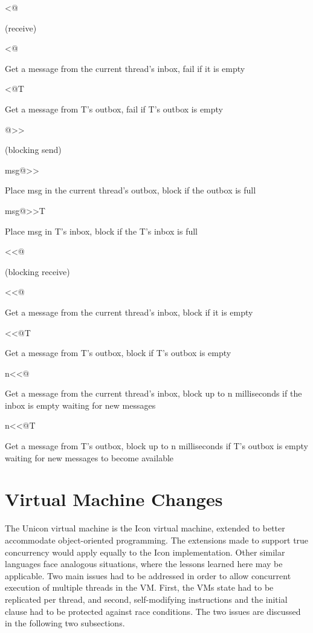 <@

(receive)

<@

Get a message from the current thread's inbox, fail if it is empty

<@T

Get a message from T's outbox, fail if T's outbox is empty

@>>

(blocking send)

msg@>>

Place msg in the current thread's outbox, block if the outbox is full

msg@>>T

Place msg in T's inbox, block if the T's inbox is full

<<@

(blocking receive)

<<@

Get a message from the current thread's inbox, block if it is empty

<<@T

Get a message from T's outbox, block if T's outbox is empty

n<<@

Get a message from the current thread's inbox, block up to n milliseconds if
the inbox is empty waiting for new messages

n<<@T

Get a message from T's outbox, block up to n milliseconds if T's outbox is empty
waiting for new messages to become available


\section{Virtual Machine Changes}
The Unicon virtual machine is the Icon virtual machine, extended to better accommodate
object-oriented programming. The extensions made to support true concurrency would apply
equally to the Icon implementation. Other similar languages face analogous situations,
where the lessons learned here may be applicable. Two main issues had to be addressed
in order to allow concurrent execution of multiple threads in the VM. First, the VMs
state had to be replicated per thread, and second, self-modifying instructions and the
initial clause had to be protected against race conditions. The two issues are discussed
in the following two subsections.

